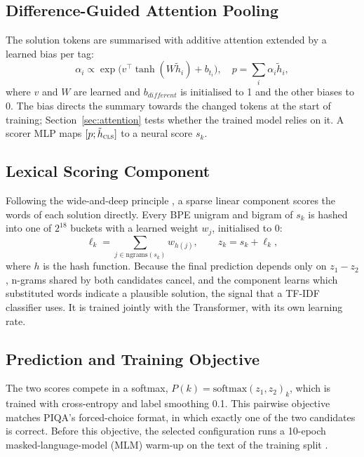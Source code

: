 \documentclass[11pt]{article}
\begin{document}
\subsection{Difference-Guided Attention Pooling}
The solution tokens are summarised with additive attention \cite{bahdanau2015neural} extended by a learned bias per tag:
\begin{equation}
\alpha_i \propto \exp\big(v^\top \tanh(W \tilde{h}_i) + b_{t_i}\big),\quad p = \textstyle\sum_i \alpha_i \tilde{h}_i,
\end{equation}
where $v$ and $W$ are learned and $b_{\textit{different}}$ is initialised to 1 and the other biases to 0. The bias directs the summary towards the changed tokens at the start of training; Section~\ref{sec:attention} tests whether the trained model relies on it. A scorer MLP maps $[p; \tilde{h}_{\textsc{cls}}]$ to a neural score $s_k$.

\subsection{Lexical Scoring Component}
Following the wide-and-deep principle \cite{cheng2016wide}, a sparse linear component scores the words of each solution directly. Every BPE unigram and bigram of $s_k$ is hashed into one of $2^{18}$ buckets with a learned weight $w_j$, initialised to 0:
\begin{equation}
\ell_k = \textstyle\sum_{j \in \mathrm{ngrams}(s_k)} w_{h(j)},\qquad z_k = s_k + \ell_k,
\end{equation}
where $h$ is the hash function. Because the final prediction depends only on $z_1 - z_2$, n-grams shared by both candidates cancel, and the component learns which substituted words indicate a plausible solution, the signal that a TF-IDF classifier uses. It is trained jointly with the Transformer, with its own learning rate.

\subsection{Prediction and Training Objective}
The two scores compete in a softmax, $P(k) = \mathrm{softmax}(z_1, z_2)_k$, which is trained with cross-entropy and label smoothing 0.1. This pairwise objective matches PIQA's forced-choice format, in which exactly one of the two candidates is correct. Before this objective, the selected configuration runs a 10-epoch masked-language-model (MLM) warm-up on the text of the training split \cite{devlin2019bert}.
\end{document}
